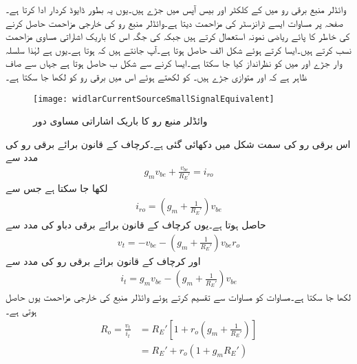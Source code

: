 وائڈلر منبع برقی رو میں  کے کلکٹر اور بیس آپس میں جڑے ہیں۔یوں یہ بطور ڈایوڈ کردار ادا کرتا ہے۔صفحہ  پر مساوات  ایسے ٹرانزسٹر کی مزاحمت  دیتا ہے۔وائڈلر منبع رو کی خارجی مزاحمت حاصل کرنے کی خاطر  کا پائے ریاضی نمونہ استعمال کرتے ہیں جبکہ  کی جگہ اس کا باریک اشاراتی مساوی مزاحمت  نسب کرتے ہیں۔ایسا کرتے ہوئے شکل  الف حاصل ہوتا ہے۔آپ جانتے ہیں کہ  ہوتا ہے۔یوں  ہے لہٰذا سلسلہ وار جڑے  اور  میں  کو نظرانداز کیا جا سکتا ہے۔ایسا کرنے سے شکل  ب حاصل ہوتا ہے جہاں سے صاف ظاہر ہے کہ  اور  متوازی جڑے ہیں۔ کو  لکھتے ہوئے اس میں برقی رو کو  لکھا جا سکتا ہے۔
%
\begin{figure}
\centering
\texttt{[image: widlarCurrentSourceSmallSignalEquivalent]}
\caption{وائڈلر منبع رو کا باریک اشاراتی مساوی دور}
\label{شکل_تفرقی_وائڈلر_پیداکار_برقی_رو_مساوی}
\end{figure}
اس برقی رو کی سمت شکل میں دکھائی گئی ہے۔کرچاف کے قانون برائے برقی رو کی مدد سے
\begin{align*}
g_m v_{be}+\frac{v_{be}}{R_E'}=i_{ro} 
\end{align*}
لکھا جا سکتا ہے جس سے
\begin{align*}
i_{ro}=\left(g_m +\frac{1}{R_E'} \right) v_{be}
\end{align*}
حاصل ہوتا ہے۔یوں کرچاف کے قانون برائے برقی دباو کی مدد سے
\begin{align}\label{مساوات_تفرقی_وائڈلر_ٹیسٹ_برقی_دباو}
v_t=-v_{be}-\left(g_m +\frac{1}{R_E'} \right) v_{be} r_o
\end{align}
اور کرچاف کے قانون برائے برقی رو کی مدد سے
\begin{align}\label{مساوات_تفرقی_وائڈلر_ٹیسٹ_برقی_رو}
i_t=g_m v_{be}-\left(g_m +\frac{1}{R_E'} \right) v_{be}
\end{align}
لکھا جا سکتا ہے۔مساوات  کو مساوات  سے تقسیم کرتے ہوئے وائڈلر منبع کی خارجی مزاحمت  یوں حاصل ہوتی ہے۔
\begin{align*}
R_o=\frac{v_t}{i_t}&=R_E' \left[1+r_o \left(g_m+\frac{1}{R_E'} \right) \right]\\
&=R_E'+r_o\left(1+g_m R_E' \right)
\end{align*}

